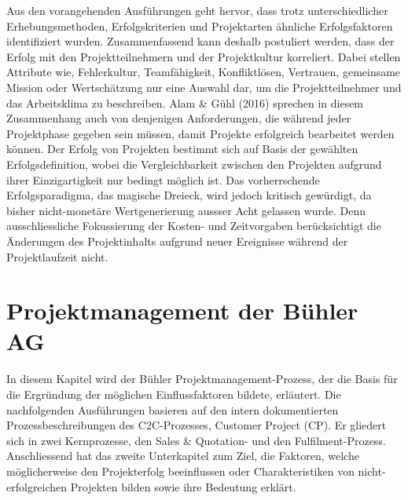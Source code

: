 \newline Aus den vorangehenden Ausführungen geht hervor, dass trotz unterschiedlicher Erhebungsmethoden, Erfolgskriterien und Projektarten ähnliche Erfolgsfaktoren identifiziert wurden. Zusammenfassend kann deshalb postuliert werden, dass der Erfolg mit den Projektteilnehmern und der Projektkultur korreliert. Dabei stellen Attribute wie, Fehlerkultur, Teamfähigkeit, Konfliktlösen, Vertrauen, gemeinsame Mission oder Wertschätzung nur eine Auswahl dar, um die Projektteilnehmer und das Arbeitsklima zu beschreiben. Alam \& Gühl (2016) sprechen in diesem Zusammenhang auch von denjenigen Anforderungen, die während jeder Projektphase gegeben sein müssen, damit Projekte erfolgreich bearbeitet werden können. Der Erfolg von Projekten bestimmt sich auf Basis der gewählten Erfolgsdefinition, wobei die Vergleichbarkeit zwischen den Projekten aufgrund ihrer Einzigartigkeit nur bedingt möglich ist. Das vorherrschende Erfolgsparadigma, das magische Dreieck, wird jedoch kritisch gewürdigt, da bisher nicht-monetäre Wertgenerierung aussser Acht gelassen wurde. Denn ausschliessliche Fokussierung der Kosten- und Zeitvorgaben berücksichtigt die Änderungen des Projektinhalts aufgrund neuer Ereignisse während der Projektlaufzeit  nicht.
\section{Projektmanagement der Bühler AG}
In diesem Kapitel wird der Bühler Projektmanagement-Prozess, der die Basis für die Ergründung der möglichen Einflussfaktoren bildete, erläutert. Die nachfolgenden Ausführungen basieren auf den intern dokumentierten Prozessbeschreibungen des C2C-Prozesses, Customer Project (CP). Er gliedert sich in zwei Kernprozesse, den Sales \& Quotation- und den Fulfilment-Prozess. Anschliessend hat das zweite Unterkapitel zum Ziel, die Faktoren, welche möglicherweise den Projekterfolg beeinflussen oder Charakteristiken von nicht-erfolgreichen Projekten bilden sowie ihre Bedeutung erklärt.
